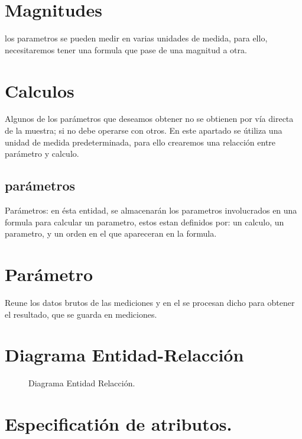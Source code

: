 \documentclass[a4paper,10pt]{article}
\begin{document}
\section{Magnitudes}
  los parametros se pueden medir en varias unidades de medida, para ello, necesitaremos tener una formula que pase de una magnitud a otra.

\section{Calculos}
Algunos de los parámetros que deseamos obtener no se obtienen por vía directa de la muestra; si no debe operarse con otros. En este apartado se útiliza una unidad de medida predeterminada, para ello crearemos una relacción entre parámetro y calculo.

\subsection{parámetros}
Parámetros: en ésta entidad, se almacenarán los parametros involucrados en una formula para calcular un parametro, estos estan definidos por: un calculo, un parametro, y un orden en el que apareceran en la formula.

\section{Parámetro}
Reune los datos brutos de las mediciones y en el se procesan dicho para obtener el resultado, que se guarda en mediciones.

\pagebreak

\section{Diagrama Entidad-Relacción}
\begin{center}
	\begin{figure}[hbt]
		\begin{center}
			\scalebox{.6}{
				\hspace{-1.7cm}
				
			}
		\end{center}
		\caption{Diagrama Entidad Relacción.}
		\label{fig:diagramaER}
	\end{figure}
\end{center}



\pagebreak

\section{Especificatión de atributos.}
\end{document}
